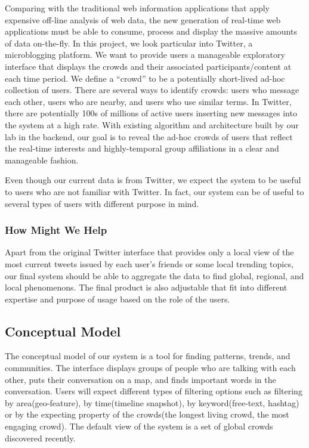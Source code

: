 \documentclass{sig-alternate}
\begin{document}
Comparing with the traditional web information applications that apply
expensive off-line analysis of web data, the new generation of real-time web
applications must be able to consume, process and display the massive amounts
of data on-the-fly. In this project, we look particular into Twitter, a
microblogging platform. We want to provide users a manageable
exploratory interface that displays the crowds and their associated
participants/content at each time period.  We define a ``crowd'' to be a
potentially short-lived ad-hoc collection of users.  There are several ways to
identify crowds: users who message each other, users who are nearby, and users
who use similar terms. In Twitter, there are potentially 100s of millions of
active users inserting new messages into the system at a high rate. With
existing algorithm and architecture built by our lab in the backend, our goal
is to reveal the ad-hoc crowds of users that reflect the real-time interests
and highly-temporal group affiliations in a clear and manageable fashion.

Even though our current data is from Twitter, we expect the system to be useful
to users who are not familiar with Twitter. In fact, our system can be of
useful to several types of users with different purpose in mind.

\subsubsection{How Might We Help}
Apart from the original Twitter interface that provides only a local view of
the most current tweets issued by each user's friends or some local trending
topics, our final system should be able to aggregate the data to find global,
regional, and local phenomenons. The final product is also adjustable that fit
into different expertise and purpose of usage based on the role of the users.

\subsection{Conceptual Model}
The conceptual model of our system is a tool for finding patterns, trends, and
communities. The interface displays groups of people who are talking with each
other, puts their conversation on a map, and finds important words in the
conversation. Users will expect different types of filtering options such as
filtering by area(geo-feature), by time(timeline snapshot), by
keyword(free-text, hashtag) or by the expecting property of the crowds(the
longest living crowd, the most engaging crowd). The default view of the system
is a set of global crowds discovered recently.
\end{document}
